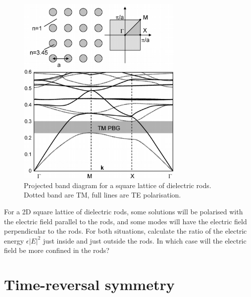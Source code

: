 \begin{figure}
\centering
\includegraphics[width=8cm]{symmetry/figures/square_bands}
\caption{Projected band diagram for a square lattice of dielectric rods. Dotted band are TM, full lines are TE polarisation.}
\label{fig-bands-rods}
\end{figure}


\begin{exer}
For a 2D square lattice of dielectric rods, some solutions will be polarised with the electric field parallel to the rods, and some modes will have the electric field perpendicular to the rods. For both situations, calculate the ratio of the electric energy $\epsilon |E|^2$ just inside and just outside the rods. In which case will the electric field be more confined in the rods?
\end{exer}

 
\pagebreak

\section{Time-reversal symmetry}

